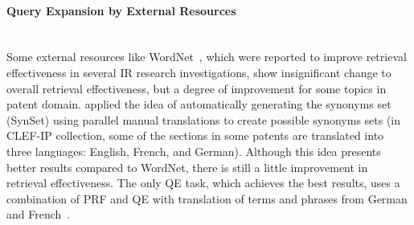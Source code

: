 \paragraph{Query Expansion by External Resources}
\ \\
Some external resources like WordNet~\citep{miller1990introduction}, which were reported to improve retrieval effectiveness in several IR research investigations, show insignificant change to overall retrieval effectiveness, but a degree of improvement for some topics in patent domain. \cite{magdy2011study} applied the idea of automatically generating the synonyms set (SynSet) using parallel manual translations to create possible synonyms sets (in CLEF-IP collection, some of the sections in some patents are translated into three languages: English, French, and German). Although this idea presents better results compared to WordNet, there is still a little improvement in retrieval effectiveness. The only QE task, which achieves the best results, uses a combination of PRF and QE with translation of terms and phrases from German and French~\citep{jochim2011expanding}.
